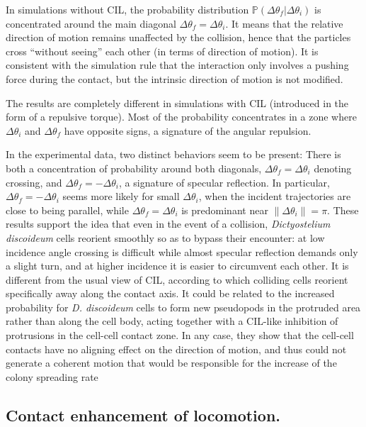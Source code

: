 \documentclass[11pt, twocolumn]{article}
\newcommand{\dth}{\Delta\theta}
\begin{document}
In simulations without CIL, the probability distribution
$\mathbb{P}(\Delta\theta_f|\Delta\theta_i)$ is concentrated around the
main diagonal $\Delta\theta_f=\Delta\theta_i$. It means that the
relative direction of motion remains unaffected by the collision,
hence that the particles cross ``without seeing'' each other (in terms
of direction of motion).  It is consistent with the simulation rule
that the interaction only involves a pushing force during the contact,
but the intrinsic direction of motion is not modified.

The results are completely different in simulations with CIL
(introduced in the form of a repulsive torque). Most of the
probability concentrates in a zone where $\dth_i$ and $\dth_f$ have
opposite signs, a signature of the angular repulsion.

In the experimental data, two distinct behaviors seem to be present:
There is both a concentration of probability around both diagonals,
$\dth_f=\dth_i$ denoting crossing, and $\dth_f=-\dth_i$, a signature
of specular reflection. In particular, $\dth_f=-\dth_i$
seems more likely for small $\dth_i$, when the incident trajectories
are close to being parallel, while $\dth_f=\dth_i$ is
predominant near $\|\dth_i\|=\pi$.  These results support the idea
that even in the event of a collision, \textit{Dictyostelium
  discoideum} cells reorient smoothly so as to bypass their encounter:
at low incidence angle crossing is difficult while almost specular
reflection demands only a slight turn, and at higher incidence it is easier
to circumvent each other. It is different from the usual view of CIL,
according to which colliding cells reorient specifically away along the
contact axis. It could be related to the increased
probability for \textit{D. discoideum} cells to form new pseudopods in
the protruded area rather than along the cell body\cite{Bosgraaf2009},
acting together with a CIL-like inhibition of protrusions in the
cell-cell contact zone. In any case, they show that the cell-cell contacts
have no aligning effect on the direction of motion, and thus could not
generate a coherent motion that would be responsible for the increase of the colony spreading rate

\subsection{Contact enhancement of locomotion.}
\end{document}
